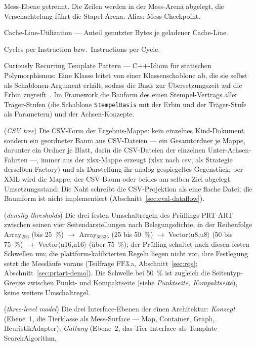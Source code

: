 \begin{description}
  Mess-Ebene getrennt. Die Zeilen werden in der Mess-Arena abgelegt, die Verschachtelung führt die
  Stapel-Arena. Alias: Mess-Checkpoint.
  \item[CLU] Cache-Line-Utilization --- Anteil genutzter Bytes je geladener Cache-Line.
  \item[CPI, IPC] Cycles per Instruction bzw.\ Instructions per Cycle.
  \item[CRTP] Curiously Recurring Template Pattern --- C++-Idiom für statischen Polymorphismus:
  Eine Klasse leitet von einer Klassenschablone ab, die sie selbst als Schablonen-Argument erhält,
  sodass die Basis zur Übersetzungszeit auf die Erbin zugreift~\cite{coplien1995crtp}. Im Framework
  die Bauform des einen Stempel-Vertrags aller Träger-Stufen (die Schablone \texttt{StempelBasis}
  mit der Erbin und der Träger-Stufe als Parametern) und der Achsen-Konzepte.
  \item[CSV-Baum] (\emph{CSV tree}) Die CSV-Form der Ergebnis-Mappe: kein einzelnes Kind-Dokument,
  sondern ein geordneter Baum aus CSV-Dateien --- ein Gesamtordner je Mappe, darunter ein Ordner je
  Blatt, darin die CSV-Dateien der einzelnen Unter-Achsen-Fahrten ---, immer aus der xlsx-Mappe erzeugt
  (xlsx nach csv, als Strategie derselben Factory) und als Darstellung ihr analog gespiegeltes
  Gegenstück; per XML wird die Mappe, der CSV-Baum oder beides am selben Ziel abgelegt.
  Umsetzungsstand: Die Naht schreibt die CSV-Projektion als eine flache Datei; die Baumform ist
  nicht implementiert (Abschnitt~\ref{sec:eval-dataflow}).
  \item[Dichte-Schwellen] (\emph{density thresholds}) Die drei festen Umschaltregeln des Prüflings
  PRT-ART zwischen seinen vier Seitendarstellungen nach Belegungsdichte, in der Reihenfolge
  Array$_{256}$ (bis 25~\%) $\to$ Array$_{65535}$ (25 bis 50~\%) $\to$ Vector$\langle$u8,u8$\rangle$
  (50 bis 75~\%) $\to$ Vector$\langle$u16,u16$\rangle$ (über 75~\%); der Prüfling schaltet nach
  diesen festen Schwellen um; die plattform-kalibrierten Regeln liegen nicht vor, ihre Festlegung
  setzt die Messläufe voraus (Teilfrage FF3.a,
  Abschnitt~\ref{sec:rqs}; Abschnitt~\ref{sec:prtart-demo}). Die Schwelle bei 50~\% ist zugleich die
  Seitentyp-Grenze zwischen Punkt- und Kompaktseite (siehe \emph{Punktseite, Kompaktseite}), keine
  weitere Umschaltregel.
  \item[Drei-Ebenen-Modell] (\emph{three-level model}) Die drei Interface-Ebenen der einen
  Architektur: \emph{Konzept} (Ebene~1, die Tierklasse als Mess-Surface --- Map, Container, Graph,
  HeuristikAdapter), \emph{Gattung} (Ebene~2, das Tier-Interface als Template --- SearchAlgorithm,

\end{description}

